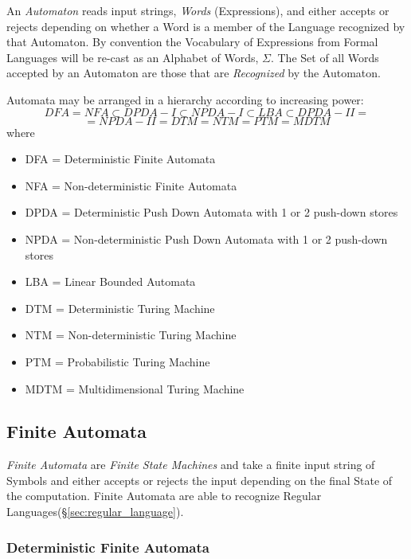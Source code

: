 An \emph{Automaton} reads input strings, \emph{Words} (Expressions),
and either accepts or rejects depending on whether a Word is a member
of the Language recognized by that Automaton. By convention the
Vocabulary of Expressions from Formal Languages will be re-cast as an
Alphabet of Words, $\Sigma$. The Set of all Words accepted by an
Automaton are those that are \emph{Recognized} by the Automaton.

Automata may be arranged in a hierarchy according to increasing power:
\[
    DFA = NFA \subset DPDA-I \subset NPDA-I \subset LBA \subset DPDA-II =
\]\[
    = NPDA-II = DTM = NTM = PTM = MDTM
\]
where
\begin{itemize}
\item DFA = Deterministic Finite Automata
\item NFA = Non-deterministic Finite Automata
\item DPDA = Deterministic Push Down Automata with 1
  or 2 push-down stores
\item NPDA = Non-deterministic Push Down Automata
  with 1 or 2 push-down stores
\item LBA = Linear Bounded Automata
\item DTM = Deterministic Turing Machine
\item NTM = Non-deterministic Turing Machine
\item PTM = Probabilistic Turing Machine
\item MDTM = Multidimensional Turing Machine
\end{itemize}



\subsection{Finite Automata}\label{sec:finite_automata}

\emph{Finite Automata} are \emph{Finite State Machines} and take a
finite input string of Symbols and either accepts or rejects the input
depending on the final State of the computation. Finite Automata are
able to recognize Regular Languages(\S\ref{sec:regular_language}).



\subsubsection{Deterministic Finite Automata}\label{sec:dfa}

